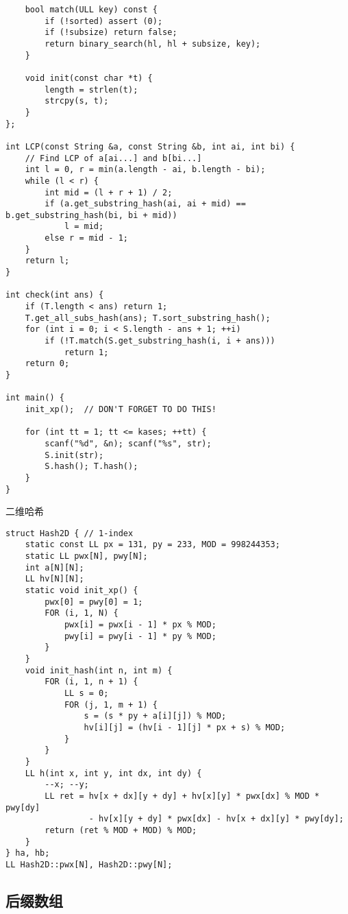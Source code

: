 \documentclass[]{article}
\begin{document}
\begin{verbatim}
    bool match(ULL key) const {
        if (!sorted) assert (0);
        if (!subsize) return false;
        return binary_search(hl, hl + subsize, key);
    }

    void init(const char *t) {
        length = strlen(t);
        strcpy(s, t);
    }
};

int LCP(const String &a, const String &b, int ai, int bi) {
    // Find LCP of a[ai...] and b[bi...]
    int l = 0, r = min(a.length - ai, b.length - bi);
    while (l < r) {
        int mid = (l + r + 1) / 2;
        if (a.get_substring_hash(ai, ai + mid) == b.get_substring_hash(bi, bi + mid))
            l = mid;
        else r = mid - 1;
    }
    return l;
}

int check(int ans) {
    if (T.length < ans) return 1;
    T.get_all_subs_hash(ans); T.sort_substring_hash();
    for (int i = 0; i < S.length - ans + 1; ++i)
        if (!T.match(S.get_substring_hash(i, i + ans)))
            return 1;
    return 0;
}

int main() {
    init_xp();  // DON'T FORGET TO DO THIS!

    for (int tt = 1; tt <= kases; ++tt) {
        scanf("%d", &n); scanf("%s", str);
        S.init(str);
        S.hash(); T.hash();
    }
}
\end{verbatim}

二维哈希

\begin{verbatim}
struct Hash2D { // 1-index
    static const LL px = 131, py = 233, MOD = 998244353;
    static LL pwx[N], pwy[N];
    int a[N][N];
    LL hv[N][N];
    static void init_xp() {
        pwx[0] = pwy[0] = 1;
        FOR (i, 1, N) {
            pwx[i] = pwx[i - 1] * px % MOD;
            pwy[i] = pwy[i - 1] * py % MOD;
        }
    }
    void init_hash(int n, int m) {
        FOR (i, 1, n + 1) {
            LL s = 0;
            FOR (j, 1, m + 1) {
                s = (s * py + a[i][j]) % MOD;
                hv[i][j] = (hv[i - 1][j] * px + s) % MOD;
            }
        }
    }
    LL h(int x, int y, int dx, int dy) {
        --x; --y;
        LL ret = hv[x + dx][y + dy] + hv[x][y] * pwx[dx] % MOD * pwy[dy]
                 - hv[x][y + dy] * pwx[dx] - hv[x + dx][y] * pwy[dy];
        return (ret % MOD + MOD) % MOD;
    }
} ha, hb;
LL Hash2D::pwx[N], Hash2D::pwy[N];
\end{verbatim}

\hypertarget{ux540eux7f00ux6570ux7ec4}{%
\subsection{后缀数组}\label{ux540eux7f00ux6570ux7ec4}}
\end{document}
